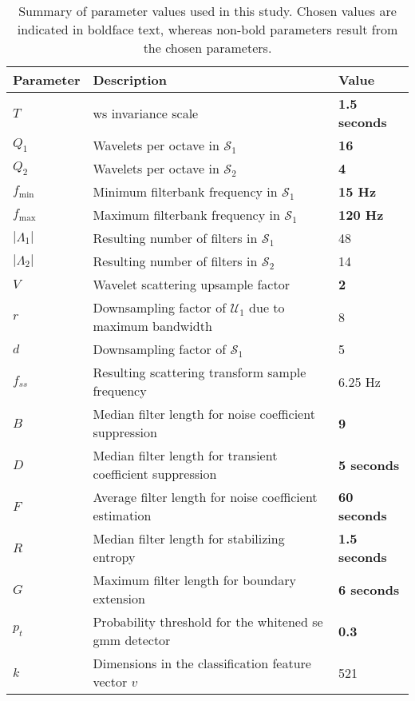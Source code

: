{\begin{subappendices}
    \begin{table}[h]
        \caption[Summary of parameter values used in this study. ]{Summary of parameter values used in this study. Chosen values are indicated in boldface text, whereas non-bold parameters result from the chosen parameters.}
        \label{tab:parameters}
            \begin{tabular}{lll} 
                \textbf{Parameter}      & \textbf{Description} & \textbf{Value} \\ \hline
                $T$ & \ac{ws} invariance scale & \textbf{1.5 seconds} \\
                $Q_1$ & Wavelets per octave in $\mathcal{S}_1$ & \textbf{16} \\
                $Q_2$ & Wavelets per octave in $\mathcal{S}_2$ & \textbf{4} \\
                $f_\text{min}$ & Minimum filterbank frequency in $\mathcal{S}_1$ & \textbf{15 Hz}\\
                $f_\text{max}$ & Maximum filterbank frequency in $\mathcal{S}_1$ & \textbf{120 Hz}\\
                $|\Lambda_1|$ & Resulting number of filters in $\mathcal{S}_1$ & 48 \\
                $|\Lambda_2|$ & Resulting number of filters in $\mathcal{S}_2$ & 14 \\
                $V$ & Wavelet scattering upsample factor & \textbf{2} \\
                $r$ & Downsampling factor of $\mathcal{U}_1$ due to maximum bandwidth & 8 \\
                $d$ & Downsampling factor of $\mathcal{S}_1$ & 5 \\
                $f_{ss}$ & Resulting scattering transform sample frequency & 6.25 Hz \\
                $B$ & Median filter length for noise coefficient suppression & \textbf{9} \\
                $D$ & Median filter length for transient coefficient suppression  & \textbf{5 seconds} \\
                $F$ & Average filter length for noise coefficient estimation  & \textbf{60 seconds} \\
                $R$ & Median filter length for stabilizing entropy  & \textbf{1.5 seconds} \\
                $G$ & Maximum filter length for boundary extension  & \textbf{6 seconds} \\
                $p_t$ & Probability threshold for the whitened \ac{se} \ac{gmm} detector & \textbf{0.3} \\ 
                $k$ & Dimensions in the classification feature vector $v$ & 521\\ 
                \end{tabular}
                \end{table}
                

\end{subappendices}}

